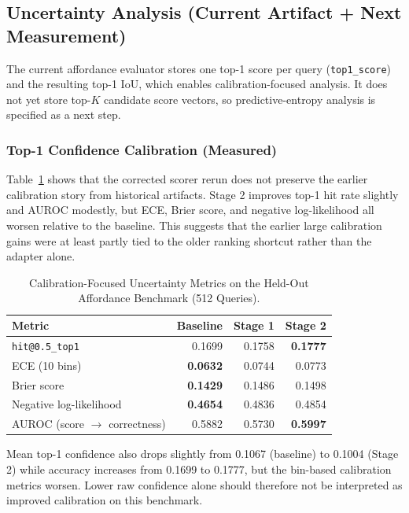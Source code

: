 \documentclass{uai2026} %
\begin{document}
\subsection{Uncertainty Analysis (Current Artifact + Next Measurement)}\label{sec:uncertainty}
The current affordance evaluator stores one top-1 score per query (\texttt{top1\_score}) and the resulting top-1 IoU, which enables calibration-focused analysis. It does not yet store top-\(K\) candidate score vectors, so predictive-entropy analysis is specified as a next step.

\subsubsection{Top-1 Confidence Calibration (Measured)}
Table~\ref{tab:calibration} shows that the corrected scorer rerun does not
preserve the earlier calibration story from historical artifacts. Stage 2
improves top-1 hit rate slightly and AUROC modestly, but ECE, Brier score, and
negative log-likelihood all worsen relative to the baseline. This suggests
that the earlier large calibration gains were at least partly tied to the
older ranking shortcut rather than the adapter alone.

\begin{table}[t]
\centering
\caption{Calibration-Focused Uncertainty Metrics on the Held-Out Affordance Benchmark (512 Queries).}
\label{tab:calibration}
\begin{tabular}{lrrr}
\toprule
Metric & Baseline & Stage 1 & Stage 2 \\
\midrule
\texttt{hit@0.5\_top1} & 0.1699 & 0.1758 & \textbf{0.1777} \\
ECE (10 bins) & \textbf{0.0632} & 0.0744 & 0.0773 \\
Brier score & \textbf{0.1429} & 0.1486 & 0.1498 \\
Negative log-likelihood & \textbf{0.4654} & 0.4836 & 0.4854 \\
AUROC (score \(\rightarrow\) correctness) & 0.5882 & 0.5730 & \textbf{0.5997} \\
\bottomrule
\end{tabular}
\end{table}

Mean top-1 confidence also drops slightly from 0.1067 (baseline) to 0.1004
(Stage 2) while accuracy increases from 0.1699 to 0.1777, but the bin-based
calibration metrics worsen. Lower raw confidence alone should therefore not be
interpreted as improved calibration on this benchmark.
\end{document}
